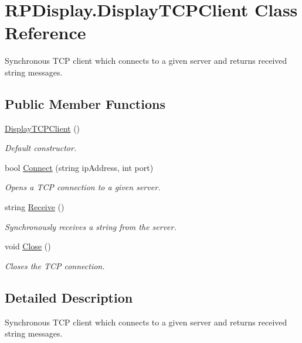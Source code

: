 \hypertarget{class_r_p_display_1_1_display_t_c_p_client}{\section{\-R\-P\-Display.\-Display\-T\-C\-P\-Client \-Class \-Reference}
\label{class_r_p_display_1_1_display_t_c_p_client}
}


\-Synchronous \-T\-C\-P client which connects to a given server and returns received string messages.  


\subsection*{\-Public \-Member \-Functions}
\begin{DoxyCompactItemize}
\item 
\hyperlink{class_r_p_display_1_1_display_t_c_p_client_a05213a618c07c6ab55f250d66314f02c}{\-Display\-T\-C\-P\-Client} ()
\begin{DoxyCompactList}\small\item\em \-Default constructor. \end{DoxyCompactList}\item 
bool \hyperlink{class_r_p_display_1_1_display_t_c_p_client_a668fe756b24c1f9bc7c83a75a43269e9}{\-Connect} (string ip\-Address, int port)
\begin{DoxyCompactList}\small\item\em \-Opens a \-T\-C\-P connection to a given server. \end{DoxyCompactList}\item 
string \hyperlink{class_r_p_display_1_1_display_t_c_p_client_a4890cc8d164e578f8de68181fd16559f}{\-Receive} ()
\begin{DoxyCompactList}\small\item\em \-Synchronously receives a string from the server. \end{DoxyCompactList}\item 
void \hyperlink{class_r_p_display_1_1_display_t_c_p_client_a1a9f3eb84e0335afcd7c221c80e510dd}{\-Close} ()
\begin{DoxyCompactList}\small\item\em \-Closes the \-T\-C\-P connection. \end{DoxyCompactList}\end{DoxyCompactItemize}


\subsection{\-Detailed \-Description}
\-Synchronous \-T\-C\-P client which connects to a given server and returns received string messages. 



